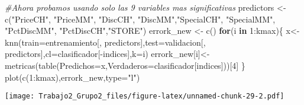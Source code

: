\documentclass[
]{article}
\newenvironment{Shaded}{\begin{snugshade}}{\end{snugshade}}
\newcommand{\AttributeTok}[1]{\textcolor[rgb]{0.77,0.63,0.00}{#1}}
\newcommand{\CommentTok}[1]{\textcolor[rgb]{0.56,0.35,0.01}{\textit{#1}}}
\newcommand{\ControlFlowTok}[1]{\textcolor[rgb]{0.13,0.29,0.53}{\textbf{#1}}}
\newcommand{\DecValTok}[1]{\textcolor[rgb]{0.00,0.00,0.81}{#1}}
\newcommand{\FunctionTok}[1]{\textcolor[rgb]{0.00,0.00,0.00}{#1}}
\newcommand{\NormalTok}[1]{#1}
\newcommand{\OtherTok}[1]{\textcolor[rgb]{0.56,0.35,0.01}{#1}}
\newcommand{\SpecialCharTok}[1]{\textcolor[rgb]{0.00,0.00,0.00}{#1}}
\newcommand{\StringTok}[1]{\textcolor[rgb]{0.31,0.60,0.02}{#1}}
\begin{document}
\begin{Shaded}
\begin{Highlighting}[]
\CommentTok{\#Ahora probamos usando solo las 9 variables mas significativas}
\NormalTok{predictors }\OtherTok{\textless{}{-}} \FunctionTok{c}\NormalTok{(}\StringTok{"PriceCH"}\NormalTok{, }\StringTok{"PriceMM"}\NormalTok{, }\StringTok{"DiscCH"}\NormalTok{, }\StringTok{"DiscMM"}\NormalTok{,}\StringTok{"SpecialCH"}\NormalTok{, }\StringTok{"SpecialMM"}\NormalTok{, }\StringTok{"PctDiscMM"}\NormalTok{, }\StringTok{"PctDiscCH"}\NormalTok{,}\StringTok{"STORE"}\NormalTok{)}
\NormalTok{errork\_new }\OtherTok{\textless{}{-}} \FunctionTok{c}\NormalTok{()}
\ControlFlowTok{for}\NormalTok{(i }\ControlFlowTok{in} \DecValTok{1}\SpecialCharTok{:}\NormalTok{kmax)\{}
\NormalTok{  x}\OtherTok{\textless{}{-}}\FunctionTok{knn}\NormalTok{(}\AttributeTok{train=}\NormalTok{entrenamiento[, predictors],}\AttributeTok{test=}\NormalTok{validacion[, predictors],}\AttributeTok{cl=}\NormalTok{clasificador[}\SpecialCharTok{{-}}\NormalTok{indices],}\AttributeTok{k=}\NormalTok{i)}
\NormalTok{errork\_new[i]}\OtherTok{\textless{}{-}}\FunctionTok{metricas}\NormalTok{(}\FunctionTok{table}\NormalTok{(}\AttributeTok{Predichos=}\NormalTok{x,}\AttributeTok{Verdaderos=}\NormalTok{clasificador[indices]))[}\DecValTok{4}\NormalTok{]}
\NormalTok{\}}
\FunctionTok{plot}\NormalTok{(}\FunctionTok{c}\NormalTok{(}\DecValTok{1}\SpecialCharTok{:}\NormalTok{kmax),errork\_new,}\AttributeTok{type=}\StringTok{"l"}\NormalTok{)}
\end{Highlighting}
\end{Shaded}

\texttt{[image: Trabajo2\_Grupo2\_files/figure-latex/unnamed-chunk-29-2.pdf]}

\begin{Shaded}
\end{Shaded}
\end{document}
